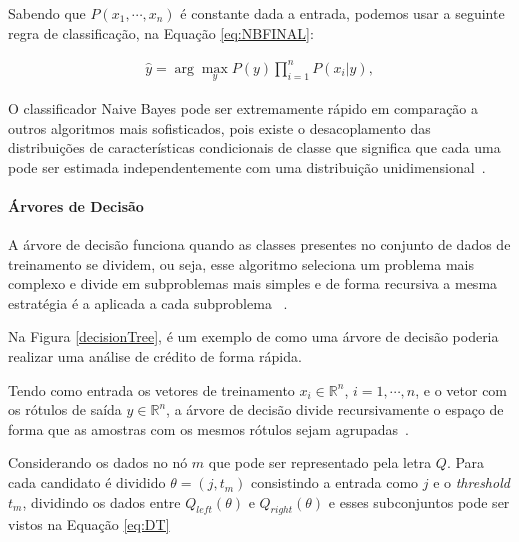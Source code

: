         Sabendo que $P(x_{1},\cdots, x_{n})$ é constante dada a entrada, podemos usar a seguinte regra de classificação, na Equação \ref{eq:NBFINAL}:
        
        \begin{equation}\label{eq:NBFINAL}
          \begin{aligned}
            \widehat{y} = \arg\max_{y} P(y)\prod_{i=1}^{n}P(x_{i}|y),
        \end{aligned}
        \end{equation}


        O classificador Naive Bayes pode ser extremamente rápido em comparação a outros algoritmos mais sofisticados, pois existe o desacoplamento
        das distribuições de características condicionais de classe que significa que cada uma pode ser estimada independentemente com uma distribuição unidimensional~\cite{zhang2004optimality}.


        \paragraph{Árvores de Decisão}

          A árvore de decisão funciona quando as classes presentes no conjunto de dados de treinamento se dividem, ou seja, esse algoritmo seleciona
          um problema mais complexo e divide em subproblemas mais simples e de forma recursiva a mesma estratégia é a aplicada a cada subproblema ~\cite{coelhoanalise}.


          Na Figura \ref{decisionTree}, é um exemplo de como uma árvore de decisão poderia realizar uma análise de crédito de forma rápida. 




          Tendo como entrada os vetores de treinamento $x_{i} \in \mathbb{R}^{n}$, $i=1,\cdots, n$, e o vetor com os rótulos de saída $y \in \mathbb{R}^{n}$,
          a árvore de decisão divide recursivamente o espaço de forma que as amostras com os mesmos rótulos sejam agrupadas~\cite{breiman2017classification}.

          Considerando os dados no nó $m$ que pode ser representado pela letra $Q$. Para cada candidato é dividido $\theta = (j,t_{m})$ consistindo 
          a entrada como $j$ e o \textit{threshold} $t_{m}$, dividindo os dados entre $Q_{left}(\theta)$ e $Q_{right}(\theta)$ e esses subconjuntos pode ser vistos na
          Equação \ref{eq:DT}


